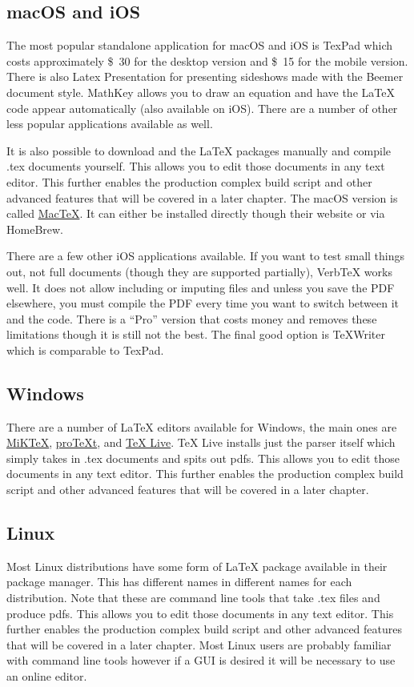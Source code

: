 \subsection{macOS and iOS}
The most popular standalone application for macOS and iOS is TexPad which costs approximately \SI{30}[\$]{} for the desktop version and \SI{15}[\$]{} for the mobile version. There is also Latex Presentation for presenting sideshows made with the Beemer document style. MathKey allows you to draw an equation and have the \LaTeX{} code appear automatically (also available on iOS). There are a number of other less popular applications available as well.\par
It is also possible to download and the \LaTeX{} packages manually and compile .tex documents yourself. This allows you to edit those documents in any text editor. This further enables the production complex build script and other advanced features that will be covered in a later chapter. The macOS version is called \href{http://www.tug.org/mactex/}{MacTeX}. It can either be installed directly though their website or via HomeBrew.\par
There are a few other iOS applications available. If you want to test small things out, not full documents (though they are supported partially), VerbTeX works well. It does not allow including or imputing files and unless you save the PDF elsewhere, you must compile the PDF every time you want to switch between it and the code. There is a ``Pro'' version that costs money and removes these limitations though it is still not the best. The final good option is TeXWriter which is comparable to TexPad.

\subsection{Windows}
There are a number of \LaTeX{} editors available for Windows, the main ones are \href{https://miktex.org/}{MiKTeX}, \href{http://www.tug.org/protext/}{proTeXt}, and \href{http://www.tug.org/texlive/}{TeX Live}. TeX Live installs just the parser itself which simply takes in .tex documents and spits out pdfs. This allows you to edit those documents in any text editor. This further enables the production complex build script and other advanced features that will be covered in a later chapter.

\subsection{Linux}
Most Linux distributions have some form of \LaTeX{} package available in their package manager. This has different names in different names for each distribution. Note that these are command line tools that take .tex files and produce pdfs. This allows you to edit those documents in any text editor. This further enables the production complex build script and other advanced features that will be covered in a later chapter. Most Linux users are probably familiar with command line tools however if a GUI is desired it will be necessary to use an online editor.
